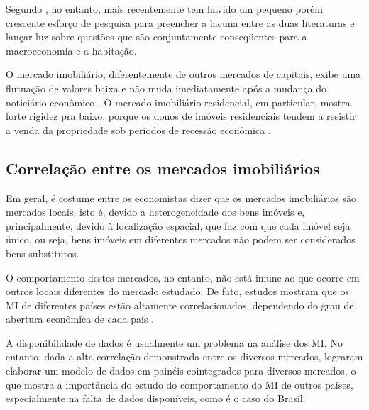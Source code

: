 \documentclass[
	12pt,				%
	oneside,			%
	a4paper,			%
	chapter=TITLE,		%
	section=TITLE,		%
	english,			%
	brazil				%
	]{abntex2}
\begin{document}
Segundo \textcite[p.~4]{LEUNG}, no entanto, mais recentemente tem havido um pequeno porém
crescente esforço de pesquisa para preencher a lacuna entre as duas literaturas
e lançar luz sobre questões que são conjuntamente conseqüentes para a
macroeconomia e a habitação.

O mercado imobiliário, diferentemente de outros mercados de capitais, exibe uma
flutuação de valores baixa e não muda imediatamente após a mudança do noticiário
econômico \autocite[3]{ADAMS2010}. O mercado imobiliário residencial, em particular,
mostra forte rigidez pra baixo, porque os donos de imóveis residenciais tendem a
resistir a venda da propriedade sob períodos de recessão econômica \autocite[
129]{Case2000}.

\hypertarget{correlauxe7uxe3o-entre-os-mercados-imobiliuxe1rios}{%
\subsection{Correlação entre os mercados imobiliários}\label{correlauxe7uxe3o-entre-os-mercados-imobiliuxe1rios}}

Em geral, é costume entre os economistas dizer que os mercados imobiliários são
mercados locais, isto é, devido a heterogeneidade dos bens imóveis e,
principalmente, devido à localização espacial, que faz com que cada imóvel seja
único, ou seja, bens imóveis em diferentes mercados não podem ser
considerados bens substitutos.

O comportamento destes mercados, no entanto, não está imune ao que ocorre em
outros locais diferentes do mercado estudado. De fato, estudos mostram que os
\gls{MI} de diferentes países estão altamente correlacionados, dependendo do
grau de abertura econômica de cada país \autocite{Case2000,ADAMS2010}.

A disponibilidade de dados é usualmente um problema na análise dos \gls{MI}. No
entanto, dada a alta correlação demonstrada entre os diversos mercados,
\textcite{ADAMS2010} lograram elaborar um modelo de dados em painéis cointegrados
para diversos mercados, o que mostra a importância do estudo do comportamento do
\gls{MI} de outros países, especialmente na falta de dados disponíveis, como é
o caso do Brasil.
\end{document}
